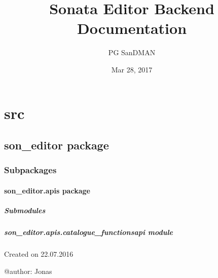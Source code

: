 \documentclass[letterpaper,10pt,english]{sphinxmanual}
\title{Sonata Editor Backend Documentation}
\date{Mar 28, 2017}
\author{PG SanDMAN}
\begin{document}
\maketitle
\sphinxtableofcontents
{}\label{index::doc}



\chapter{src}
\label{_source/modules::doc}\label{_source/modules:welcome-to-sonata-editor-backend-s-documentation}\label{_source/modules:src}

\section{son\_editor package}
\label{_source/son_editor::doc}\label{_source/son_editor:son-editor-package}

\subsection{Subpackages}
\label{_source/son_editor:subpackages}

\subsubsection{son\_editor.apis package}
\label{_source/son_editor.apis::doc}\label{_source/son_editor.apis:son-editor-apis-package}

\paragraph{Submodules}
\label{_source/son_editor.apis:submodules}

\paragraph{son\_editor.apis.catalogue\_functionsapi module}
\label{_source/son_editor.apis:module-son_editor.apis.catalogue_functionsapi}\label{_source/son_editor.apis:son-editor-apis-catalogue-functionsapi-module}
Created on 22.07.2016

@author: Jonas
\end{document}
